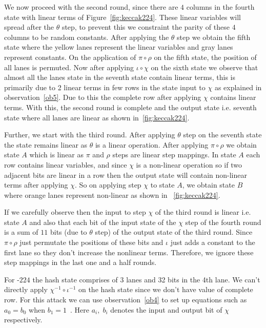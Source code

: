 We now proceed with the second round, since there are $4$ columns in the fourth state with linear terms of Figure~\ref{fig:keccak224}. These linear variables will spread after the $\theta$ step, to prevent this we constraint the parity of these $4$ columns to be random constants. After applying the $\theta$ step we obtain the fifth state where the yellow lanes represent the linear variables and gray lanes represent constants. On the application of $\pi \circ \rho$ on the fifth state, the position of all lanes is permuted. Now after applying $\iota \circ \chi$ on the sixth state we observe that almost all the lanes state in the seventh state contain linear terms, this is primarily due to 2 linear terms in few rows in the state input to $\chi$ as explained in observation~\ref{ob5}. Due to this the complete row after applying $\chi$ contains linear terms. With this, the second round is complete and the output state i.e. seventh state where all lanes are linear as shown in~\ref{fig:keccak224}.

Further, we start with the third round. After applying $\theta$ step on the seventh state the state remains linear as $\theta$ is a linear operation. After applying $\pi \circ \rho$ we obtain state $A$ which is linear as $\pi$ and $\rho$ steps are linear step mappings. In state $A$ each row contains linear variables, and since $\chi$ is a non-linear operation so if two adjacent bits are linear in a row then the output state will contain non-linear terms after applying $\chi$. So on applying step $\chi$ to state $A$, we obtain state $B$ where orange lanes represent non-linear as shown in ~\ref{fig:keccak224}.

If we carefully observe then the input to step $\chi$ of the third round is linear i.e. state $A$ and also that each bit of the input state of the $\chi$ step of the fourth round is a sum of $11$ bits (due to $\theta$ step) of the output state of the third round. Since $\pi \circ \rho$ just permutate the positions of these bits and $\iota$ just adds a constant to the first lane so they don't increase the nonlinear terms. Therefore, we ignore these step mappings in the last one and a half rounds.

For \Keccak{}-$224$ the hash state comprises of 3 lanes and 32 bits in the 4th lane. We can't directly apply $\chi^{-1} \circ \iota^{-1}$ on the hash state since we don't have value of complete row. For this attack we can use observation~\ref{ob4} to set up equations such as $a_0 = b_0$ when $b_1 = 1$~\cite{guo2016linear}. Here $a_i, \; b_i$ denotes the input and output bit of $\chi$ respectively.


